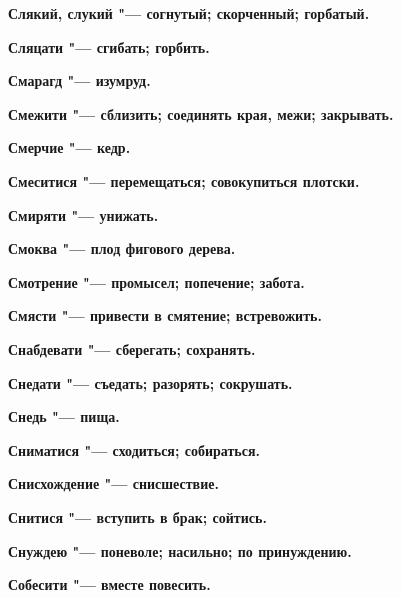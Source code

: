 \bfseries Слякий, слукий \normalfont{} "--- согнутый; скорченный; горбатый. 




\bfseries Сляцати \normalfont{} "--- сгибать; горбить. 




\bfseries Смарагд \normalfont{} "--- изумруд. 




\bfseries Смежити \normalfont{} "--- сблизить; соединять края, межи; закрывать. 




\bfseries Смерчие \normalfont{} "--- кедр. 




\bfseries Смеситися \normalfont{} "--- перемещаться; совокупиться плотски. 




\bfseries Смиряти \normalfont{} "--- унижать. 




\bfseries Смоква \normalfont{} "--- плод фигового дерева. 




\bfseries Смотрение \normalfont{} "--- промысел; попечение; забота. 




\bfseries Смясти \normalfont{} "--- привести в смятение; встревожить. 




\bfseries Снабдевати \normalfont{} "--- сберегать; сохранять. 




\bfseries Снедати \normalfont{} "--- съедать; разорять; сокрушать. 




\bfseries Снедь \normalfont{} "--- пища. 




\bfseries Сниматися \normalfont{} "--- сходиться; собираться. 




\bfseries Снисхождение \normalfont{} "--- снисшествие. 




\bfseries Снитися \normalfont{} "--- вступить в брак; сойтись. 




\bfseries Снуждею \normalfont{} "--- поневоле; насильно; по принуждению. 




\bfseries Собесити \normalfont{} "--- вместе повесить. 




